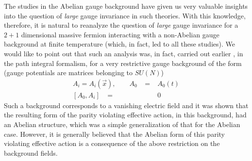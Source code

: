 \documentclass[a4paper,12pt]{article}
\begin{document}
The studies in the Abelian gauge background have given us very
valuable insights into the question of {\it large} gauge invariance in
such theories. With this knowledge, therefore, it is natural to
reanalyze the question of {\it large} gauge invariance for a $2+1$
dimensional massive fermion interacting with a non-Abelian gauge background at
finite temperature (which, in fact, led to all these studies). We
would like to point out that such an analysis was, in fact, carried
out earlier \cite{fosco:1997vu}, in the path integral formalism, for
a very restrictive
gauge background of the form (gauge potentials are matrices 
belonging to $SU(N)$)
\begin{eqnarray}
A_{i} = A_{i}(\vec{x}),\qquad A_{0} \;\;\;= & A_{0}(t)\nonumber\\
\left[A_{0}, A_{i}\right] \;\;\;= & \!\!\!\!\!\!\!\!\!\! 0\label{1}
\end{eqnarray}
Such a background corresponds to a vanishing electric field and it was
shown  that the resulting form of the parity violating
effective action, in this background, had an Abelian structure, which
was  a simple generalization  of that for the Abelian case.
However, it is generally believed that the Abelian form of this
parity violating effective action is a consequence of the above restriction
on the background fields. 
\end{document}
